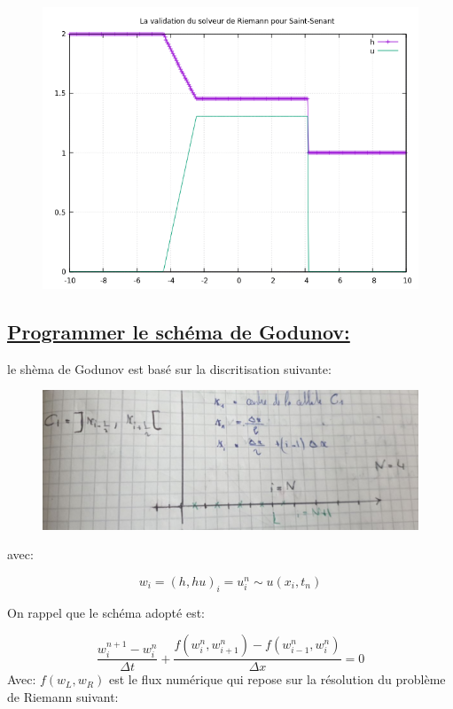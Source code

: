 \begin{figure}[h!]
	\centering \includegraphics[scale=0.7]{Images_Fichiers/tp2q1.png}
\end{figure}
\newpage
\subsection[Programmer le sch\'ema de Godunov]{\uline{Programmer le sch\'ema de Godunov:}}

le sh\`ema de Godunov est bas\'e sur la discritisation suivante:

\begin{figure}[h!]
	\centering \includegraphics[scale=0.25]{Images_Fichiers/Y5.png}
\end{figure}
avec:

$$w_i = (h,hu)_i = u_i^n \sim u(x_i,t_n)$$

On rappel que le sch\'ema adopt\'e est:

$$ \frac {w_i^{n+1} -w_i^n}{\Delta t} + \frac {f(w_{i}^{n},w_{i+1}^{n}) - f(w_{i-1}^{n},w_{i}^{n})}{\Delta x} = 0$$ 
Avec:
$f(w_L, w_R)$ est le flux num\'erique qui repose sur la r\'esolution du probl\`eme de Riemann suivant:


